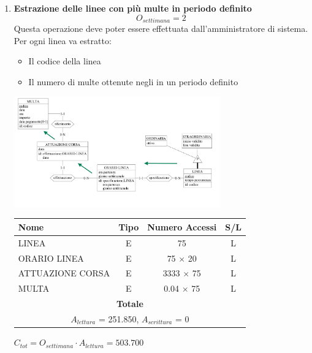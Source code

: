 \documentclass[12pt,a4paper]{report}
\begin{document}
\begin{enumerate}[label=\textbf{\arabic*}]

    \item\textbf{Estrazione delle linee con più multe in periodo definito} \label{op11} \\
	\[{O_{settimana} = 2}\]
	Questa operazione deve poter essere effettuata dall'amministratore di sistema.\\
	Per ogni linea va estratto:
	\begin{itemize}
	\renewcommand\labelitemi{--}
	    \item Il codice della linea
	    \item Il numero di multe ottenute negli in un periodo definito
	\end{itemize}
	\begin{center}
	\includegraphics[width=0.7\textwidth]{VisualLineeConPiuMulte}
	\end{center}

	\begin{table}[H]
	\centering
	\begin{tabular}{|l|c|c|c|}
	\hline
	Nome & Tipo & Numero Accessi & S/L \\
	\hline
	LINEA & E & 75 & L \\
	\hline
	ORARIO LINEA & E & 75 $\times$ 20 & L \\
	\hline
	ATTUAZIONE CORSA & E & 3333 $\times$ 75 & L \\
	\hline
	MULTA & E & 0.04 $\times$ 75 & L \\
	    \hline
	    \multicolumn{4}{c}{\textbf{Totale}} \\
	    \multicolumn{4}{c}{${A_{lettura}}$ = 251.850, ${A_{scrittura}}$ = 0} \\
	    \hline
	\end{tabular}
	\end{table}
	    \begin{center}
	    ${C_{tot} = {O_{settimana}}\cdot{A_{lettura}}= 503.700}$
	    \end{center}



\end{enumerate}
\end{document}
